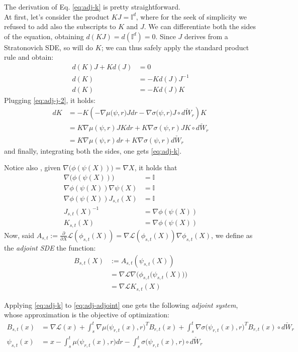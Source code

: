 \documentclass[11pt]{article}
\begin{document}
The derivation of Eq. \ref{eq:adj-k} is pretty straightforward. \\ 
At first, let's consider the product $KJ = \mathbb{I}^d$, where for the seek of simplicity we refused to add also the subscripts 
to $K$ and $J$. We can differentiate both the sides of the equation, obtaining $d(KJ) = d(\mathbb{I}^d) = 0$. Since $J$ derives from a Stratonovich SDE, so will do $K$; we can thus safely apply the standard product rule and obtain:
\begin{align}
  d(K)J + Kd(J) &= 0 \nonumber \\ 
  d(K) &= -Kd(J) J^{-1} \nonumber \\ 
  d(K) &= - Kd(J)K 
\end{align} 
Plugging \ref{eq:adj-j-2}, it holds:
\begin{align}
  dK &= - K(- \nabla \mu\big(\psi, r\big) J dr - \nabla \sigma \big(\psi, r \big)J \circ d\check W_r) K \\ 
  &= K \nabla \mu (\psi, r) JK dr + K \nabla \sigma (\psi, r) JK \circ d\check W_r \\ 
  &= K \nabla \mu(\psi, r)dr + K \nabla \sigma(\psi, r)d \check W_r
\end{align}
and finally, integrating both the sides, one gets \ref{eq:adj-k}.

Notice also , given $\nabla \big(\phi(\psi (X))\big) = \nabla X$, it holds that
\begin{align}
  \nabla \big(\phi(\psi (X))\big) &= \mathbb{I} \nonumber \\
  \nabla \phi(\psi (X)) \nabla \psi(X) &= \mathbb{I} \nonumber \\ 
  \nabla \phi(\psi (X)) J_{s,t}(X) &= \mathbb{I} \nonumber \\ 
  J_{s,t}(X)^{-1} &= \nabla \phi(\psi (X)) \nonumber \\ 
  K_{s,t}(X) &= \nabla \phi(\psi (X))
\end{align}
Now, said $A_{s,t} := \frac{\partial}{\partial X} \mathcal{L}(\phi_{s,t}(X)) = \nabla \mathcal{L}(\phi_{s,t}(X))\nabla \phi_{s,t}(X) $,
 we define as the \textit{adjoint SDE} the function:
\begin{align}
  B_{s,t}(X) &:= A_{s,t}(\psi_{s,t}(X)) \nonumber \\ 
  &= \nabla \mathcal{L} \nabla \big( \phi_{s,t}\big(\psi_{s,t}(X) \big)\big) \nonumber \\ 
  &= \nabla \mathcal{L} K_{s,t}(X) \label{eq:adj-adjoint}
\end{align}

Applying \ref{eq:adj-k} to \ref{eq:adj-adjoint} one gets the following \textit{adjoint system}, whose approximation is the objective of optimization:
\begin{align}
  B_{s,t}(x) &= \nabla \mathcal{L}(x) + \int_s^t \nabla \mu \big(\psi_{r,t}(x), r \big)^T B_{r,t}(x) + \int_s^t \nabla \sigma \big(\psi_{r,t}(x),r \big)^T B_{r,t}(x) \circ d\check W_r \\ 
  \psi_{s,t}(x) &= x - \int_s^t \mu\big(\psi_{r,t}(x), r\big)dr - \int_s^t \sigma\big(\psi_{r,t}(x),r \big) \circ d\check W_r
\end{align}
\end{document}
